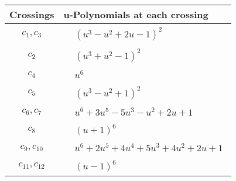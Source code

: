 \documentclass[1p]{elsarticle_modified}
\theoremstyle{definition}
\begin{document}
\begin{tabular}{m{50pt}|m{274pt}}
Crossings & \hspace{64pt}u-Polynomials at each crossing \\
\hline $$\begin{aligned}c_{1},c_{3}\end{aligned}$$&$\begin{aligned}
&(u^3- u^2+2 u-1)^2
\end{aligned}$\\
\hline $$\begin{aligned}c_{2}\end{aligned}$$&$\begin{aligned}
&(u^3+u^2-1)^2
\end{aligned}$\\
\hline $$\begin{aligned}c_{4}\end{aligned}$$&$\begin{aligned}
&u^6
\end{aligned}$\\
\hline $$\begin{aligned}c_{5}\end{aligned}$$&$\begin{aligned}
&(u^3- u^2+1)^2
\end{aligned}$\\
\hline $$\begin{aligned}c_{6},c_{7}\end{aligned}$$&$\begin{aligned}
&u^6+3 u^5-5 u^3- u^2+2 u+1
\end{aligned}$\\
\hline $$\begin{aligned}c_{8}\end{aligned}$$&$\begin{aligned}
&(u+1)^6
\end{aligned}$\\
\hline $$\begin{aligned}c_{9},c_{10}\end{aligned}$$&$\begin{aligned}
&u^6+2 u^5+4 u^4+5 u^3+4 u^2+2 u+1
\end{aligned}$\\
\hline $$\begin{aligned}c_{11},c_{12}\end{aligned}$$&$\begin{aligned}
&(u-1)^6
\end{aligned}$\\
\hline
\end{tabular}\\~\\
\end{document}
